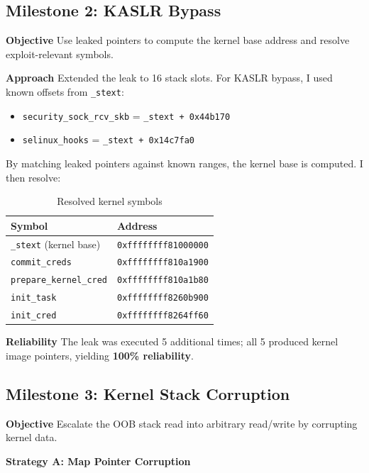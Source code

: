 \subsection{Milestone 2: KASLR Bypass}

\textbf{Objective}
Use leaked pointers to compute the kernel base address and resolve exploit-relevant symbols.

\textbf{Approach}
Extended the leak to 16 stack slots. For KASLR bypass, I used known offsets from \texttt{\_stext}:
\begin{itemize}
    \item \texttt{security\_sock\_rcv\_skb} = \texttt{\_stext + 0x44b170}
    \item \texttt{selinux\_hooks} = \texttt{\_stext + 0x14c7fa0}
\end{itemize}

By matching leaked pointers against known ranges, the kernel base is computed. I then resolve:
\begin{table}[H]
\centering
\begin{tabular}{@{}ll@{}}
\toprule
\textbf{Symbol} & \textbf{Address} \\
\midrule
\texttt{\_stext} (kernel base) & \texttt{0xffffffff81000000} \\
\texttt{commit\_creds} & \texttt{0xffffffff810a1900} \\
\texttt{prepare\_kernel\_cred} & \texttt{0xffffffff810a1b80} \\
\texttt{init\_task} & \texttt{0xffffffff8260b900} \\
\texttt{init\_cred} & \texttt{0xffffffff8264ff60} \\
\bottomrule
\end{tabular}
\caption{Resolved kernel symbols}
\end{table}

\textbf{Reliability}
The leak was executed 5 additional times; all 5 produced kernel image pointers, yielding \textbf{100\% reliability}.


\subsection{Milestone 3: Kernel Stack Corruption}

\textbf{Objective}
Escalate the OOB stack read into arbitrary read/write by corrupting kernel data.

\textbf{Strategy A: Map Pointer Corruption}

